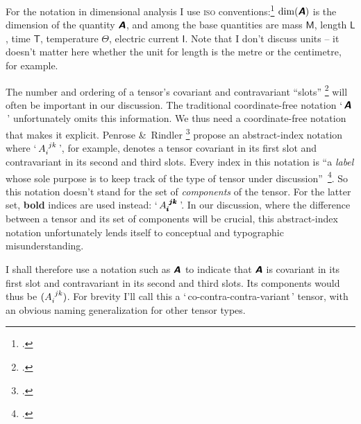 \documentclass[\ifafour a4paper,12pt,\else a5paper,10pt,\fi%
onecolumn,oneside,article,%
british%
]{memoir}
\makeatletter
\newcommand*{\defquote}[1]{`\,#1\,'}
\theoremstyle{remark}
\theoremstyle{innote}
\newcommand*{\mathte}[1]{\textbf{\textit{\textsf{#1}}}}
\newcommand*{\citep}{\footcites}
\newcommand*{\amp}{\&}
\renewcommand*{\|}[1][]{\nonscript\,#1\vert\nonscript\;\mathopen{}}
\newcommand*{\sect}{\S}%
\newcommand*{\q}{}%
\DeclareRobustCommand*{\q}{%
  \mathbin{\mathpalette\bigcdot@{}}%
}
\newcommand*{\bigcdot@scalefactor}{0.7}
\newcommand*{\bigcdot@widthfactor}{1.5}
\newcommand*{\bigcdot@}[2]{%
  \sbox0{$#1\vcenter{}$}%
  \sbox2{$#1\cdot\m@th$}%
  \hbox to \bigcdot@widthfactor\wd2{%
    \hfil
    \raise\ht0\hbox{%
      \scalebox{\bigcdot@scalefactor}{%
        \lower\ht0\hbox{$#1\bullet\m@th$}%
      }%
    }%
    \hfil
  }%
}
\newcommand*{\Le}{\textsf{L}}
\newcommand*{\Ti}{\textsf{T}}
\newcommand*{\Ma}{\textsf{M}}
\newcommand*{\Te}{\Theta}
\newcommand*{\Cu}{\textsf{I}}
\newcommand*{\yA}{\mathte{A}}
\renewcommand*{\i}{\indices}
\makeatother
\begin{document}
\bigskip

For the notation in dimensional analysis I use \textsc{iso}
conventions:\citep[\sect~5]{iso2009} $\dim(\yA)$ is the dimension of the
quantity $\yA$, and among the base quantities are mass $\Ma$, length $\Le$,
time $\Ti$, temperature $\Te$, electric current $\Cu$. Note that I don't
discuss units -- it doesn't matter here whether the unit for length is the
metre or the centimetre, for example.

The number and ordering of a tensor's covariant and contravariant
\enquote{slots} \citep[\sect~3.2]{misneretal1970_r1973} will often be
important in our discussion. The traditional coordinate-free notation
\defquote{$\yA$} unfortunately omits this information. We thus need a
coordinate-free notation that makes it explicit. Penrose \amp\ Rindler
\citep[\sect~2.2]{penroseetal1984_r2003} propose an abstract-index notation
where \defquote{$A\i{_{i}^{jk}}$}, for example, denotes a tensor covariant
in its first slot and contravariant in its second and third slots. Every
index in this notation is \enquote{a \emph{label} whose sole purpose is to
  keep track of the type of tensor under
  discussion}~\citep[p.~75]{penroseetal1984_r2003}. So this notation
doesn't stand for the set of \emph{components} of the tensor. For the
latter set, \textbf{bold} indices are used instead:
\defquote{$A\i{_{\pmb{i}}^{\pmb{j}\pmb{k}}}$}. In our discussion, where the
difference between a tensor and its set of components will be crucial, this
abstract-index notation unfortunately lends itself to conceptual and
typographic misunderstanding.

I shall therefore use a notation such as $\yA\i{_{\q}^{\q\q}}$ to indicate
that $\yA$ is covariant in its first slot and contravariant in its second
and third slots. Its components would thus be $(A\i{_{i}^{jk}})$. For
brevity I'll call this a \defquote{co-contra-contra-variant} tensor, with
an obvious naming generalization for other tensor
types. %
\end{document}
